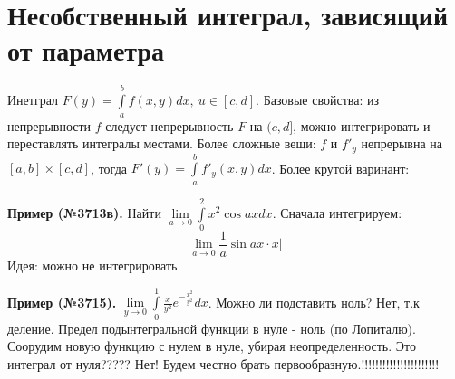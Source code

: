 \section{Несобственный интеграл, зависящий от параметра}
Инетграл $F(y)=\int\limits_{a}^{b}f(x,y)dx,~u\in [c,d]$. 
Базовые свойства: из непрерывности $f$ следует непрерывность  $F$ на $(c,d]$,
можно интегрировать и переставлять интегралы местами. Более сложные вещи:
$f$ и $f'_y$ непрерывна на  $[a,b]\times[c,d]$, тогда 
$F'(y)=\int\limits_{a}^{b}f'_y(x,y)dx$. Более крутой варинант:

\textbf{Пример (№3713в).} Найти $\lim\limits_{a \to 0}\int\limits_{0}^{2}
x^2\cos ax dx$. Сначала интегрируем: 
$$\lim\limits_{a \to 0} \frac{1}{a}\sin ax\cdot x\Big|$$
Идея: можно не интегрировать 


\textbf{Пример (№3715).} $\lim\limits_{y \to 0}\int\limits_{0}^{1} 
\frac{x}{y^2}e^{-\frac{x^2}{y^2}}dx$. 
Можно ли подставить ноль? Нет, т.к деление. 
Предел  подынтегральной функции в нуле - ноль (по Лопиталю).
Соорудим новую функцию с нулем в нуле, убирая неопределенность. 
Это интеграл от нуля????? Нет! Будем честно 
брать первообразную.!!!!!!!!!!!!!!!!!!!!!!










